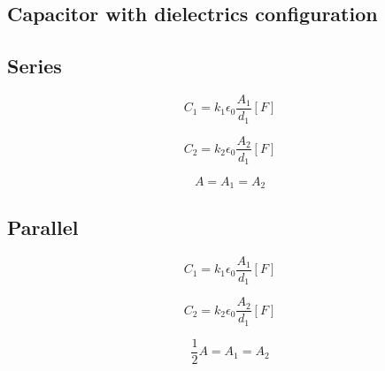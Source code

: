 \documentclass[letterpaper]{article}
\newcommand{\divline}{\noindent\makebox[\linewidth]{\rule{\textwidth}{0.4pt}}}
\begin{document}
    \divline
    \begin{multicols}{2}
        \section{Capacitor with dielectrics configuration}

        \subsection{Series}

        \[C_{1} = k_{1} \epsilon_{0} \frac{A_{1}}{d_{1}} [F]\]

        \[C_{2} = k_{2} \epsilon_{0} \frac{A_{2}}{d_{1}} [F]\]

        \[A = A_{1} = A_{2}\]

        \subsection{Parallel}

        \[C_{1} = k_{1} \epsilon_{0} \frac{A_{1}}{d_{1}} [F]\]

        \[C_{2} = k_{2} \epsilon_{0} \frac{A_{2}}{d_{1}} [F]\]

        \[\frac{1}{2} A = A_{1} = A_{2}\]
        
    \end{multicols}
\end{document}
